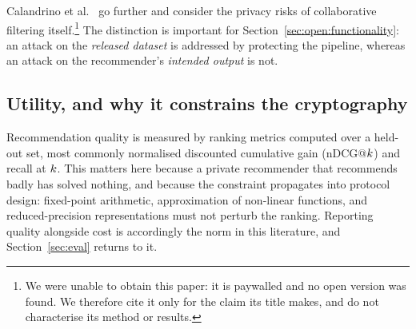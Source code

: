 Calandrino et al.~\cite{calandrino2011} go further and consider the privacy risks of collaborative
filtering itself.\footnote{We were unable to obtain this paper: it is paywalled and no open
version was found. We therefore cite it only for the claim its title makes, and do not
characterise its method or results.} The distinction is important for
Section~\ref{sec:open:functionality}: an attack on the \emph{released dataset} is addressed by
protecting the pipeline, whereas an attack on the recommender's \emph{intended output} is not.

\subsection{Utility, and why it constrains the cryptography}
\label{sec:background:utility}

Recommendation quality is measured by ranking metrics computed over a held-out set, most commonly
normalised discounted cumulative gain (nDCG@$k$) and recall at $k$. This matters here
because a private recommender that recommends badly has solved nothing, and because the
constraint propagates into protocol design: fixed-point arithmetic, approximation of non-linear
functions, and reduced-precision representations must not perturb the ranking. Reporting quality
alongside cost is accordingly the norm in this literature, and
Section~\ref{sec:eval} returns to it.
